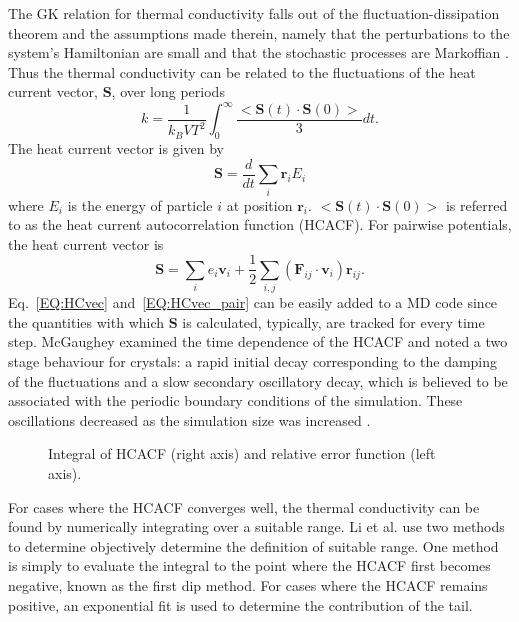 The GK relation for thermal conductivity falls out of the fluctuation-dissipation theorem and the assumptions made therein, namely that the perturbations to the system's Hamiltonian are small and that the stochastic processes are Markoffian \cite{green:398}. Thus the thermal conductivity can be related to the fluctuations of the heat current vector, $\bm{S}$, over long periods
%
\begin{equation}\label{EQ:intHCACF}
k=\frac{1}{k_B V T^2}\int_0^{\infty}\frac{<\bm{S}(t)\cdot\bm{S}(0)>}{3}dt.
\end{equation}
%
The heat current vector is given by 
%
\begin{equation}\label{EQ:HCvec}
\bm{S}=\frac{d}{dt}\sum_i\bm{r}_iE_i
\end{equation}
%
where $E_i$ is the energy of particle $i$ at position $\bm{r}_i$. $<\bm{S}(t)\cdot\bm{S}(0)>$ is referred to as the heat current autocorrelation function (HCACF). For pairwise potentials, the heat current vector is
%
\begin{equation}\label{EQ:HCvec_pair}
\bm{S}=\sum_ie_i\bm{v}_i+\frac{1}{2}\sum_{i,j}(\bm{F}_{ij}\cdot\bm{v}_{i})\bm{r}_{ij}.
\end{equation}
%
Eq.~\ref{EQ:HCvec} and~\ref{EQ:HCvec_pair} can be easily added to a MD code since the quantities with which $\bm{S}$ is calculated, typically, are tracked for every time step. McGaughey examined the time dependence of the HCACF and noted a two stage behaviour for crystals: a rapid initial decay corresponding to the damping of the fluctuations and a slow secondary oscillatory decay, which is believed to be associated with the periodic boundary conditions of the simulation. These oscillations decreased as the simulation size was increased \cite{mcgaugheythesis}.
%
\begin{figure}
\begin{center}
\renewcommand{\figure}{Fig.}
\caption{Integral of HCACF (right axis) and relative error function (left axis).}
\label{FIG:GK_bulk}
\end{center}
\end{figure}
%
For cases where the HCACF converges well, the thermal conductivity can be found by numerically integrating over a suitable range. Li et al. \cite{Li1998139} use two methods to determine objectively determine the definition of suitable range. One method is simply to evaluate the integral to the point where the HCACF first becomes negative, known as the first dip method. For cases where the HCACF remains positive, an exponential fit is used to determine the contribution of the tail.

